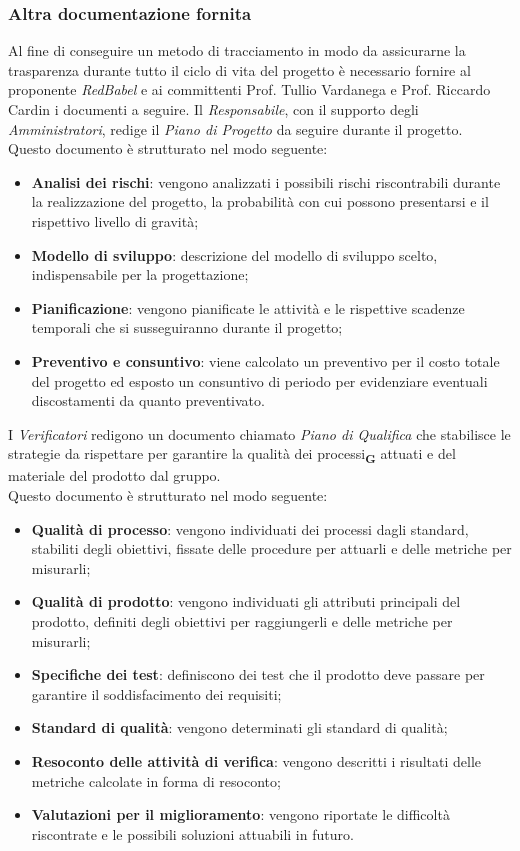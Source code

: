 \subsubsection{Altra documentazione fornita}
Al fine di conseguire un metodo di tracciamento in modo da assicurarne la trasparenza durante tutto il ciclo di vita del progetto è necessario fornire al proponente \textit{RedBabel} e ai committenti Prof. Tullio Vardanega e Prof. Riccardo Cardin i documenti a seguire.
Il \textit{Responsabile}, con il supporto degli \textit{Amministratori}, redige il \textit{Piano di Progetto} da seguire durante il progetto.
\\Questo documento è strutturato nel modo seguente:
\begin{itemize}
    \item \textbf{Analisi dei rischi}: vengono analizzati i possibili rischi riscontrabili durante la realizzazione del progetto, la probabilità con cui possono presentarsi e il rispettivo livello di gravità;
    \item \textbf{Modello di sviluppo}: descrizione del modello di sviluppo scelto, indispensabile per la progettazione;
    \item \textbf{Pianificazione}: vengono pianificate le attività e le rispettive scadenze temporali che si susseguiranno durante il progetto;
    \item \textbf{Preventivo e consuntivo}: viene calcolato un preventivo per il costo totale del progetto ed esposto un consuntivo di periodo per evidenziare eventuali discostamenti da quanto preventivato.
\end{itemize}
I \textit{Verificatori} redigono un documento chiamato \textit{Piano di Qualifica} che stabilisce le strategie da rispettare per garantire la qualità dei processi\textsubscript{\textbf{G}} attuati e del materiale del prodotto dal gruppo.
\\Questo documento è strutturato nel modo seguente:
\begin{itemize}
    \item \textbf{Qualità di processo}: vengono individuati dei processi dagli standard, stabiliti degli obiettivi, fissate delle procedure per attuarli e delle metriche per misurarli;
    \item \textbf{Qualità di prodotto}: vengono individuati gli attributi principali del prodotto, definiti degli obiettivi per raggiungerli e delle metriche per misurarli;
    \item \textbf{Specifiche dei test}: definiscono dei test che il prodotto deve passare per garantire il soddisfacimento dei requisiti;
    \item \textbf{Standard di qualità}: vengono determinati gli standard di qualità;
    \item \textbf{Resoconto delle attività di verifica}: vengono descritti i risultati delle metriche calcolate in forma di resoconto;
    \item \textbf{Valutazioni per il miglioramento}: vengono riportate le difficoltà riscontrate e le possibili soluzioni attuabili in futuro.
\end{itemize}
